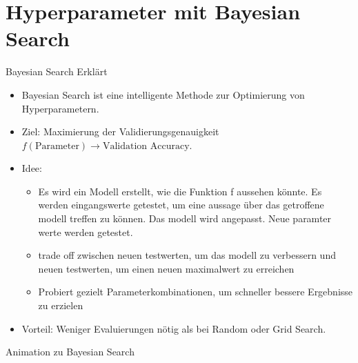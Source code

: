 \section{Hyperparameter mit Bayesian Search}

\begin{frame}{Bayesian Search Erklärt}
\begin{itemize}
    \item Bayesian Search ist eine intelligente Methode zur Optimierung von Hyperparametern.
    \item Ziel: Maximierung der Validierungsgenauigkeit $f(\text{Parameter}) \rightarrow \text{Validation Accuracy}$.
    \item Idee:
        \begin{itemize}
            \item Es wird ein Modell erstellt, wie die Funktion f aussehen könnte. Es werden eingangswerte getestet, um eine aussage über das getroffene modell treffen zu können. Das modell wird angepasst. Neue paramter werte werden getestet.
            \item trade off zwischen neuen testwerten, um das modell zu verbessern und neuen testwerten, um einen neuen maximalwert zu erreichen %
            \item Probiert gezielt Parameterkombinationen, um schneller bessere Ergebnisse zu erzielen
        \end{itemize}
    \item Vorteil: Weniger Evaluierungen nötig als bei Random oder Grid Search.
\end{itemize}
\end{frame}

\begin{frame}{Animation zu Bayesian Search}
\centering
{}
\end{frame}

